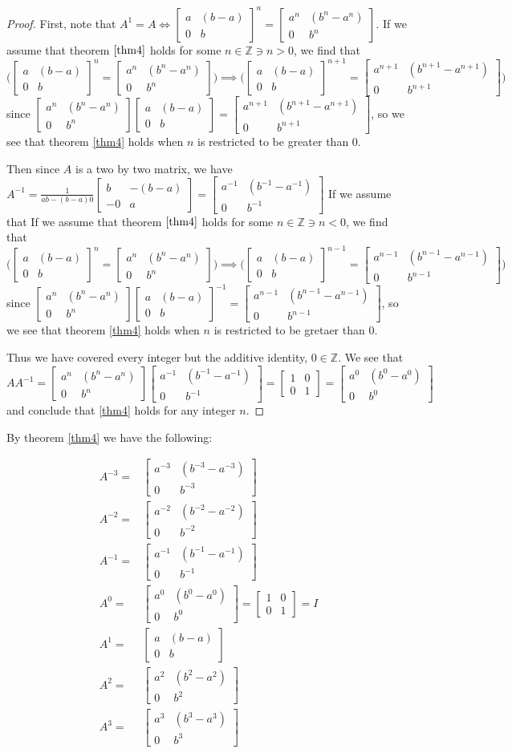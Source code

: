 \documentclass[12pt]{article}
\newcommand{\ints}{\mathbb{Z}}
\newcommand{\glmatrix}[4]{\ensuremath{\begin{bmatrix} #1 & #2 \\ #3 & #4 \end{bmatrix}}}
\newcommand{\glinverse}[4]{\ensuremath{\frac{1}{#1 #4 - #2 #3}\glmatrix{#4}{-#2}{-#3}{#1}}}
\begin{document}
\begin{proof}
	First, note that $A^1 = A \iff \glmatrix{a}{(b-a)}{0}{b}^n = \glmatrix{a^n}{(b^n-a^n)}{0}{b^n}$.
	If we assume that theorem $\ref{thm4}$ holds for some $n \in \ints \ni n > 0$,
	we find that $\Big(\glmatrix{a}{(b-a)}{0}{b}^n = \glmatrix{a^n}{(b^n-a^n)}{0}{b^n}\Big)
	\implies \Big(\glmatrix{a}{(b-a)}{0}{b}^{n+1} = \glmatrix{a^{n+1}}{(b^{n+1}-a^{n+1})}{0}{b^{n+1}}\Big)$
	since $\glmatrix{a^n}{(b^n-a^n)}{0}{b^n}\glmatrix{a}{(b-a)}{0}{b} =
	\glmatrix{a^{n+1}}{(b^{n+1}-a^{n+1})}{0}{b^{n+1}}$,
	so we see that theorem \ref{thm4} holds when $n$ is restricted
	to be greater than $0$.

	Then since $A$ is a two by two matrix,
	we have $A^{-1} = \glinverse{a}{(b-a)}{0}{b} = \glmatrix{a^{-1}}{(b^{-1}-a^{-1})}{0}{b^{-1}}$
	If we assume that 
	If we assume that theorem $\ref{thm4}$ holds for some $n \in \ints \ni n < 0$,
	we find that $\Big(\glmatrix{a}{(b-a)}{0}{b}^n = \glmatrix{a^n}{(b^n-a^n)}{0}{b^n}\Big)
	\implies \Big(\glmatrix{a}{(b-a)}{0}{b}^{n-1} = \glmatrix{a^{n-1}}{(b^{n-1}-a^{n-1})}{0}{b^{n-1}}\Big)$
	since $\glmatrix{a^n}{(b^n-a^n)}{0}{b^n}\glmatrix{a}{(b-a)}{0}{b}^{-1} =
	\glmatrix{a^{n-1}}{(b^{n-1}-a^{n-1})}{0}{b^{n-1}}$,
	so we see that theorem \ref{thm4} holds when $n$ is restricted
	to be gretaer than $0$.

	Thus we have covered every integer but the additive identity, $0 \in \ints$.
	We see that $AA^{-1} = 
	\glmatrix{a^n}{(b^n-a^n)}{0}{b^n} \glmatrix{a^{-1}}{(b^{-1}-a^{-1})}{0}{b^{-1}}
	= \glmatrix{1}{0}{0}{1}
	= \glmatrix{a^0}{(b^0-a^0)}{0}{b^0}$
	and conclude that \ref{thm4} holds for any integer $n$.
\end{proof}

By theorem \ref{thm4} we have the following:

\begin{align}
	A^{-3} = & \glmatrix{a^{-3}}{(b^{-3}-a^{-3})}{0}{b^{-3}}\\
	A^{-2} = & \glmatrix{a^{-2}}{(b^{-2}-a^{-2})}{0}{b^{-2}} \\
	A^{-1} = & \glmatrix{a^{-1}}{(b^{-1}-a^{-1})}{0}{b^{-1}}\\
	A^0 = & \glmatrix{a^0}{(b^0-a^0)}{0}{b^0} = \glmatrix{1}{0}{0}{1} = I \\
	A^1 = & \glmatrix{a}{(b-a)}{0}{b} \\
	A^2 = & \glmatrix{a^2}{(b^2-a^2)}{0}{b^2}\\
	A^3 = & \glmatrix{a^3}{(b^3-a^3)}{0}{b^3}
\end{align}
\end{document}
